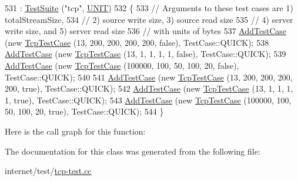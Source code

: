 \begin{DoxyCode}
531     : \hyperlink{classns3_1_1TestSuite_a904b0c40583b744d30908aeb94636d1a}{TestSuite} (\textcolor{stringliteral}{"tcp"}, \hyperlink{classns3_1_1TestSuite_a1ebfcab34ec8161e085e8e3a1855eae0a3885375a3787abf60431f8454b3cadbd}{UNIT})
532   \{
533     \textcolor{comment}{// Arguments to these test cases are 1) totalStreamSize,}
534     \textcolor{comment}{// 2) source write size, 3) source read size}
535     \textcolor{comment}{// 4) server write size, and 5) server read size}
536     \textcolor{comment}{// with units of bytes}
537     \hyperlink{classns3_1_1TestCase_a3718088e3eefd5d6454569d2e0ddd835}{AddTestCase} (\textcolor{keyword}{new} \hyperlink{classTcpTestCase}{TcpTestCase} (13, 200, 200, 200, 200, \textcolor{keyword}{false}), TestCase::QUICK);
538     \hyperlink{classns3_1_1TestCase_a3718088e3eefd5d6454569d2e0ddd835}{AddTestCase} (\textcolor{keyword}{new} \hyperlink{classTcpTestCase}{TcpTestCase} (13, 1, 1, 1, 1, \textcolor{keyword}{false}), TestCase::QUICK);
539     \hyperlink{classns3_1_1TestCase_a3718088e3eefd5d6454569d2e0ddd835}{AddTestCase} (\textcolor{keyword}{new} \hyperlink{classTcpTestCase}{TcpTestCase} (100000, 100, 50, 100, 20, \textcolor{keyword}{false}), TestCase::QUICK);
540 
541     \hyperlink{classns3_1_1TestCase_a3718088e3eefd5d6454569d2e0ddd835}{AddTestCase} (\textcolor{keyword}{new} \hyperlink{classTcpTestCase}{TcpTestCase} (13, 200, 200, 200, 200, \textcolor{keyword}{true}), TestCase::QUICK);
542     \hyperlink{classns3_1_1TestCase_a3718088e3eefd5d6454569d2e0ddd835}{AddTestCase} (\textcolor{keyword}{new} \hyperlink{classTcpTestCase}{TcpTestCase} (13, 1, 1, 1, 1, \textcolor{keyword}{true}), TestCase::QUICK);
543     \hyperlink{classns3_1_1TestCase_a3718088e3eefd5d6454569d2e0ddd835}{AddTestCase} (\textcolor{keyword}{new} \hyperlink{classTcpTestCase}{TcpTestCase} (100000, 100, 50, 100, 20, \textcolor{keyword}{true}), TestCase::QUICK);
544   \}
\end{DoxyCode}


Here is the call graph for this function\+:




The documentation for this class was generated from the following file\+:\begin{DoxyCompactItemize}
\item 
internet/test/\hyperlink{tcp-test_8cc}{tcp-\/test.\+cc}\end{DoxyCompactItemize}
